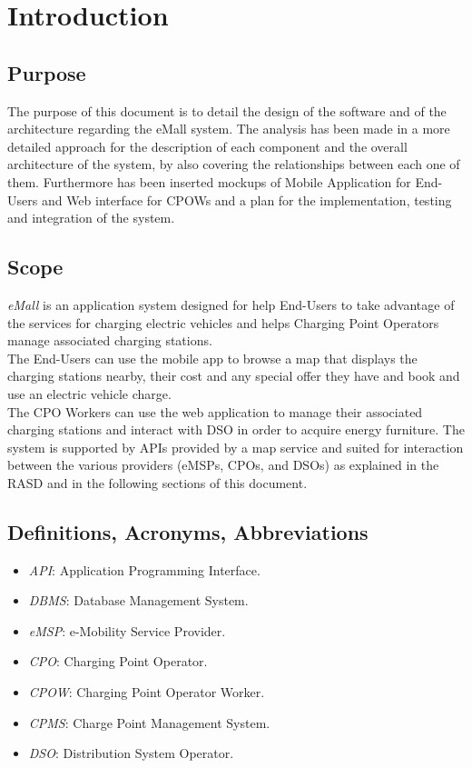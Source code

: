 \documentclass[a4paper]{report}
\begin{document}
\tableofcontents
\listoffigures
\begingroup
\let\clearpage\relax %
\listoftables
\endgroup
\restoregeometry

\chapter{Introduction}
\section{Purpose}

The purpose of this document is to detail the design of the software and of the architecture regarding the eMall system. The analysis has been made in a more detailed approach for the description of each component
and the overall architecture of the system, by also covering the relationships between each one of them. Furthermore has been inserted mockups of Mobile Application for End-Users and Web interface for CPOWs and a plan for the implementation,
testing and integration of the system.

\section{Scope}
\textit{eMall} is an application system designed for help End-Users to take advantage of the services for charging electric vehicles and helps Charging Point Operators manage associated charging
stations.\\
The End-Users can use the mobile app to browse a map that displays the charging stations nearby, their cost and any special offer they have and book and use an electric vehicle charge.\\
The CPO Workers can use the web application to manage their associated charging stations and interact with DSO in order to acquire energy furniture. The system is supported by APIs provided by a map service and suited for interaction between the various providers (eMSPs, CPOs, and DSOs) as explained in the RASD and in the following sections of this document.
\section{Definitions, Acronyms, Abbreviations}
\begin{itemize}
\item \textit{API}: Application Programming Interface.
\item \textit{DBMS}: Database Management System.
\item \textit{eMSP}: e-Mobility Service Provider.
\item \textit{CPO}: Charging Point Operator.
\item \textit{CPOW}: Charging Point Operator Worker.
\item \textit{CPMS}: Charge Point Management System.
\item \textit{DSO}: Distribution System Operator.
\end{itemize}
\end{document}
